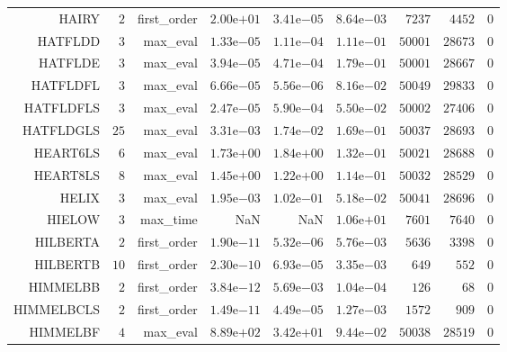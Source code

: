 \begin{longtable}{rrrrrrrrr}
HAIRY & \(     2\) & first\_order & \( 2.00\)e\(+01\) & \( 3.41\)e\(-05\) & \( 8.64\)e\(-03\) & \(  7237\) & \(  4452\) & \(     0\) \\
HATFLDD & \(     3\) & max\_eval & \( 1.33\)e\(-05\) & \( 1.11\)e\(-04\) & \( 1.11\)e\(-01\) & \( 50001\) & \( 28673\) & \(     0\) \\
HATFLDE & \(     3\) & max\_eval & \( 3.94\)e\(-05\) & \( 4.71\)e\(-04\) & \( 1.79\)e\(-01\) & \( 50001\) & \( 28667\) & \(     0\) \\
HATFLDFL & \(     3\) & max\_eval & \( 6.66\)e\(-05\) & \( 5.56\)e\(-06\) & \( 8.16\)e\(-02\) & \( 50049\) & \( 29833\) & \(     0\) \\
HATFLDFLS & \(     3\) & max\_eval & \( 2.47\)e\(-05\) & \( 5.90\)e\(-04\) & \( 5.50\)e\(-02\) & \( 50002\) & \( 27406\) & \(     0\) \\
HATFLDGLS & \(    25\) & max\_eval & \( 3.31\)e\(-03\) & \( 1.74\)e\(-02\) & \( 1.69\)e\(-01\) & \( 50037\) & \( 28693\) & \(     0\) \\
HEART6LS & \(     6\) & max\_eval & \( 1.73\)e\(+00\) & \( 1.84\)e\(+00\) & \( 1.32\)e\(-01\) & \( 50021\) & \( 28688\) & \(     0\) \\
HEART8LS & \(     8\) & max\_eval & \( 1.45\)e\(+00\) & \( 1.22\)e\(+00\) & \( 1.14\)e\(-01\) & \( 50032\) & \( 28529\) & \(     0\) \\
HELIX & \(     3\) & max\_eval & \( 1.95\)e\(-03\) & \( 1.02\)e\(-01\) & \( 5.18\)e\(-02\) & \( 50041\) & \( 28696\) & \(     0\) \\
HIELOW & \(     3\) & max\_time &       NaN &       NaN & \( 1.06\)e\(+01\) & \(  7601\) & \(  7640\) & \(     0\) \\
HILBERTA & \(     2\) & first\_order & \( 1.90\)e\(-11\) & \( 5.32\)e\(-06\) & \( 5.76\)e\(-03\) & \(  5636\) & \(  3398\) & \(     0\) \\
HILBERTB & \(    10\) & first\_order & \( 2.30\)e\(-10\) & \( 6.93\)e\(-05\) & \( 3.35\)e\(-03\) & \(   649\) & \(   552\) & \(     0\) \\
HIMMELBB & \(     2\) & first\_order & \( 3.84\)e\(-12\) & \( 5.69\)e\(-03\) & \( 1.04\)e\(-04\) & \(   126\) & \(    68\) & \(     0\) \\
HIMMELBCLS & \(     2\) & first\_order & \( 1.49\)e\(-11\) & \( 4.49\)e\(-05\) & \( 1.27\)e\(-03\) & \(  1572\) & \(   909\) & \(     0\) \\
HIMMELBF & \(     4\) & max\_eval & \( 8.89\)e\(+02\) & \( 3.42\)e\(+01\) & \( 9.44\)e\(-02\) & \( 50038\) & \( 28519\) & \(     0\) \\

\end{longtable}
